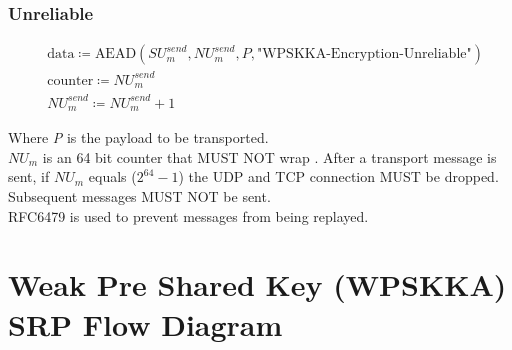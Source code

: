 \documentclass{article}
\begin{document}
    \subsubsection{Unreliable}

    \begin{align*}
        & \text{data} \coloneqq \text{AEAD}(\mathit{SU}_{m}^{send},\mathit{NU}_{m}^{send}, P,
        \text{"WPSKKA-Encryption-Unreliable"})\\
        & \text{counter} \coloneqq \mathit{NU}_{m}^{send}\\
        & \mathit{NU}_{m}^{send} \coloneqq \mathit{NU}_{m}^{send} + 1
    \end{align*}


    Where \emph{P} is the payload to be transported.\\

    $\mathit{NU}_{m}$ is an 64 bit counter that MUST NOT wrap .
    After a transport message is sent, if $\mathit{NU}_{m}$ equals
    ($2^{64}-1$) the UDP and TCP connection MUST be dropped.
    Subsequent messages MUST NOT be sent. \\

    RFC6479 is used to prevent messages from being replayed.


    \newpage


    \section{Weak Pre Shared Key (WPSKKA) SRP Flow Diagram}

\end{document}
